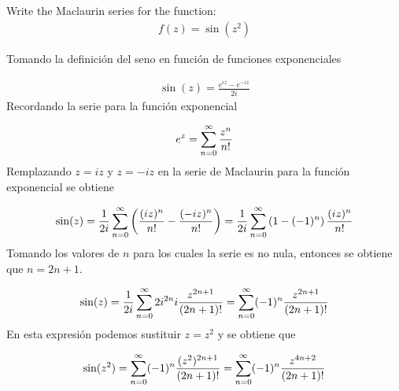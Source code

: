 \begin{problem}{5}
    Write the Maclaurin series for the function:
    \begin{gather*}
        f(z) = \sin(z^2)
    \end{gather*}    
\end{problem}

Tomando la definición del seno en función de funciones exponenciales 

\begin{gather*}
    \sin(z) = \frac{e^{iz} - e^{-iz}}{2i}
\end{gather*}
Recordando la serie para la función exponencial 

\begin{gather*}
    e^{z} = \sum_{n = 0}^{\infty} \frac{z^n}{n!}
\end{gather*}
Remplazando $z = iz$ y $z = -iz$ en la serie de Maclaurin para la función exponencial se obtiene

\begin{gather*}
    \sin(z) = \frac{1}{2i}\sum_{n = 0}^{\infty}\left(\frac{(iz)^n}{n!} - \frac{(-iz)^n}{n!}\right) = \frac{1}{2i}\sum_{n = 0}^{\infty}\left(1 - (-1)^n\right) \frac{(iz)^n}{n!}
\end{gather*}
Tomando los valores de $n$ para los cuales la serie es no nula, entonces se obtiene que $n = 2n+1$.

\begin{gather*}
    \sin(z) = \frac{1}{2i}\sum_{n = 0}^{\infty} 2i^{2n}i\frac{z^{2n+1}}{(2n+1)!} = \sum_{n = 0}^{\infty} (-1)^{n}\frac{z^{2n+1}}{(2n+1)!}
\end{gather*}
En esta expresión podemos sustituir $z = z^2$ y se obtiene que

\begin{mdframed}
    \vspace{-0.4 cm}
    \begin{gather}
        \sin(z^2) = \sum_{n = 0}^{\infty} (-1)^{n}\frac{(z^2)^{2n+1}}{(2n+1)!} = \sum_{n = 0}^{\infty} (-1)^{n}\frac{z^{4n+2}}{(2n+1)!} 
    \end{gather}
\end{mdframed}
